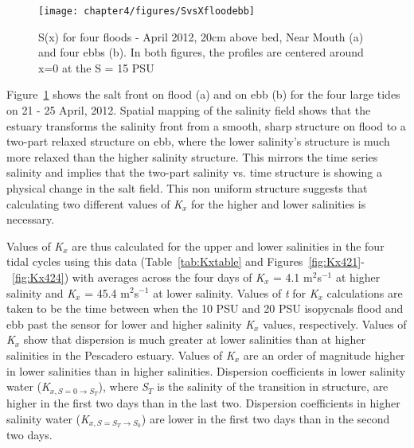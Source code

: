 \begin{figure}[hp]
	\texttt{[image: chapter4/figures/SvsXfloodebb]} 
\caption{S(x) for four floods - April 2012, 20cm above bed, Near Mouth (a) and four ebbs (b). In both figures, the profiles are centered around x=0 at the S = 15 PSU} \label{fig:SvsXall}
\end{figure}

Figure~\ref{fig:SvsXall} shows the salt front on flood (a) and on ebb (b) for the four large tides on 21 - 25 April, 2012. Spatial mapping of the salinity field shows that the estuary transforms  the salinity front from a smooth, sharp structure on flood to a two-part relaxed structure on ebb, where the lower salinity's structure is much more relaxed than the higher salinity structure. This mirrors the time series salinity and implies that the two-part salinity vs. time structure is showing a physical change in the salt field. This non uniform structure suggests that calculating two different values of \emph{K$_x$} for the higher and lower salinities is necessary.

Values of \emph{K$_x$} are thus calculated for the upper and lower salinities in the four tidal cycles using this data (Table~\ref{tab:Kxtable} and Figures~\ref{fig:Kx421}-~\ref{fig:Kx424}) with averages across the four days of \emph{K$_x$} = 4.1 m$^2$s$^{-1}$ at higher salinity and \emph{K$_x$} = 45.4 m$^2$s$^{-1}$ at lower salinity. Values of \emph{t} for \emph{K$_x$} calculations are taken to be the time between when the 10 PSU and 20 PSU isopycnals flood and ebb past the sensor for lower and higher salinity \emph{K$_x$} values, respectively. Values of \emph{K$_x$} show that dispersion is much greater at lower salinities than at higher salinities in the Pescadero estuary.  Values of \emph{K$_x$} are an order of magnitude higher in lower salinities than in higher salinities. Dispersion coefficients in lower salinity water (\emph{K$_{x,S=0 \rightarrow S_T}$}), where \emph{S$_T$} is the salinity of the transition in structure, are higher in the first two days than in the last two. Dispersion coefficients in higher salinity water (\emph{K$_{x,S=S_T \rightarrow S_0}$}) are lower in the first two days than in the second two days. 

